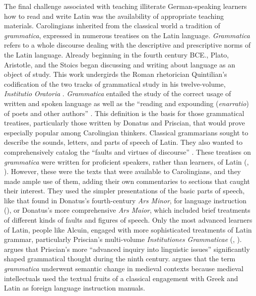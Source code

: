  The final challenge associated with teaching illiterate German-speaking learners how to read and write Latin was the availability of appropriate teaching materials. Carolingians inherited from the classical world a tradition of \textit{grammatica}, expressed in numerous treatises on the Latin language. \textit{Grammatica} refers to a whole discourse dealing with the descriptive and prescriptive norms of the Latin language. Already beginning in the fourth century BCE., Plato, Aristotle, and the Stoics began discussing and writing about language as an object of study. This work undergirds the Roman rhetorician Quintilian’s codification of the two tracks of grammatical study in his twelve-volume, \textit{Institutio} \textit{Oratoria} \citep[6]{Ciccolella2008}. \textit{Grammatica} entailed the study of the correct usage of written and spoken language as well as the “reading and expounding (\textit{enarratio}) of poets and other authors” \citep[2]{Matthews1994}. This definition is the basis for those grammatical treatises, particularly those written by Donatus and Priscian, that would prove especially popular among Carolingian thinkers. Classical grammarians sought to describe the sounds, letters, and parts of speech of Latin. They also wanted to comprehensively catalog the “faults and virtues of discourse” \citep[2]{Matthews1994}. These treatises on \textit{grammatica} were written for proficient speakers, rather than learners, of Latin (\citealt[88--89]{Law1994}, \citealt[8--9]{Matthews1994}). However, these were the texts that were available to Carolingians, and they made ample use of them, adding their own commentaries to sections that caught their interest. They used the simpler presentations of the basic parts of speech, like that found in Donatus’s fourth-century \textit{Ars Minor}, for language instruction (\citealt[503]{AurouxEtAl2000}), or Donatus’s more comprehensive \textit{Ars Maior}, which included brief treatments of different kinds of faults and figures of speech. Only the most advanced learners of Latin, people like Alcuin, engaged with more sophisticated treatments of Latin grammar, particularly Priscian’s multi-volume \textit{Institutiones Grammaticae} (\citealt[136--137]{Law1997}, \citealt[507]{AurouxEtAl2000}). \citet[145]{Luhtala1993} argues that Priscian’s more “advanced inquiry into linguistic issues” significantly shaped grammatical thought during the ninth century. \citet[299]{Barrau2011} argues that the term \textit{grammatica} underwent semantic change in medieval contexts because medieval intellectuals used the textual fruits of a classical engagement with Greek and Latin as foreign language instruction manuals.

